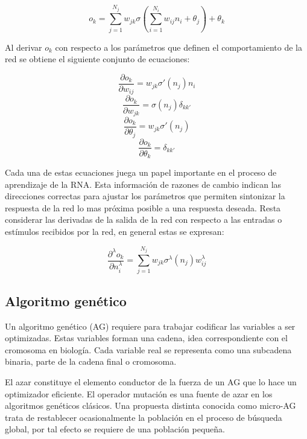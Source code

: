 \begin{equation} o_k=\sum^{N_j}_{j=1}w_{jk}\sigma(\sum^{N_i}_{i=1}w_{ij}n_i+\theta_j)+\theta_k \end{equation}

Al derivar $o_k$ con respecto a los par\'ametros que definen el comportamiento de la red se obtiene el siguiente conjunto de ecuaciones:

\begin{equation} \frac{\partial o_k}{\partial w_{ij}}=w_{jk}\sigma' (n_j)n_i \end{equation}
\begin{equation} \frac{\partial o_k}{\partial w_{jk}}=\sigma (n_j)\delta_{kk'} \end{equation}
\begin{equation} \frac{\partial o_k}{\partial \theta_j}=w_{jk}\sigma' (n_j) \end{equation}
\begin{equation} \frac{\partial o_k}{\partial \theta_k}=\delta_{kk'} \end{equation}


Cada una de estas ecuaciones juega un papel importante en el proceso de aprendizaje de la RNA. Esta informaci\'on de razones de cambio indican las direcciones correctas para ajustar los par\'ametros que permiten sintonizar la respuesta de la red lo mas pr\'oxima posible a una respuesta deseada. Resta considerar las derivadas de la salida de la red con respecto a las entradas o est\'imulos recibidos por la red, en general estas se expresan:

\begin{equation} \frac{\partial^\lambda o_k}{\partial n_i^\lambda}=\sum^{N_j}_{j=1}w_{jk}\sigma^\lambda(n_j)w_{ij}^\lambda \label{lamda} \end{equation}

\subsection{Algoritmo gen\'etico}

Un algoritmo gen\'etico (AG) requiere para trabajar codificar las variables a ser optimizadas. Estas variables forman una cadena, idea correspondiente con el cromosoma en biolog\'ia. Cada variable real se representa como una subcadena binaria, parte de la cadena final o cromosoma.

El azar constituye el elemento conductor de la fuerza de un AG que lo hace un optimizador eficiente. El operador mutaci\'on es una fuente de azar en los algoritmos gen\'eticos cl\'asicos. Una propuesta distinta conocida como micro-AG trata de restablecer ocasionalmente la poblaci\'on en el proceso de b\'usqueda global, por tal efecto se requiere de una poblaci\'on peque\~na.

